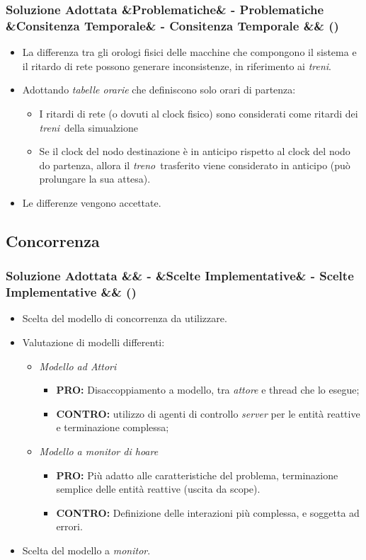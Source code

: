 \documentclass[slidestop,compress,blackandwhite]{beamer}
\newcommand{\itemB}[3]{
	\item \textbf{#1} #2 \vspace{#3}
}
\newcommand{\ii}[1]{\textit{#1}}
\newcommand{\treno}{\ii{treno}}
\newcommand{\treni}{\ii{treni}}
\newcommand{\gateway}{\ii{stazione di gateway}}
\newcommand{\newtitle}[4]{
	#1 
	\ifx&#2&%
	\else
  		\large- #2
	\fi
	\ifx&#3&%
	\else
  		\normalsize- #3
	\fi
	\ifx&#4&%
	\else
  		\normalsize (#4)
	\fi
}
\newcommand{\newframe}[5]{
	\begin{frame}
		\frametitle{\newtitle{#1}{#2}{#3}{#4}}
		#5
	\end{frame}
}
\newcommand{\myitemize}[1]{\begin{itemize}#1\end{itemize}}
\begin{document}
	\newframe{Soluzione Adottata}{Problematiche}{Consitenza Temporale}{}{
		\myitemize{
			\item La differenza tra gli orologi fisici delle macchine che compongono il sistema e il ritardo di rete possono generare inconsistenze, in riferimento ai \treni.
			\item Adottando \ii{tabelle orarie} che definiscono solo orari di partenza:
				\myitemize{
					\item I ritardi di rete (o dovuti al clock fisico) sono considerati come ritardi dei \treni~della simualzione
					\item Se il clock del nodo destinazione è in anticipo rispetto al clock del nodo do partenza, allora il \treno~trasferito viene considerato in anticipo (può prolungare la sua attesa).
				}
			\item Le differenze vengono accettate.
		}
	}
	
	\subsection{Concorrenza}\label{sol_conc}
	
	\newframe{Soluzione Adottata}{}{Scelte Implementative}{}{
		\myitemize{
			\item Scelta del modello di concorrenza da utilizzare.
			\item Valutazione di modelli differenti:
				\myitemize{
					\item \ii{Modello ad Attori}
						\myitemize{
							\itemB{PRO:}{Disaccoppiamento a modello, tra \ii{attore} e thread che lo esegue;}{0cm}
							\itemB{CONTRO:}{
									utilizzo di agenti di controllo \ii{server} per le entità reattive e terminazione complessa;
							}{0cm}
						}
					\item \ii{Modello a monitor di hoare}
						\myitemize{
							\itemB{PRO:}{Più adatto alle caratteristiche del problema, terminazione semplice delle entità reattive (uscita da scope).}{0cm}
							\itemB{CONTRO:}{Definizione delle interazioni più complessa, e soggetta ad errori.}{0cm}
						}
				}
			\item Scelta del modello a \ii{monitor}.
		}
	}
	
\end{document}
